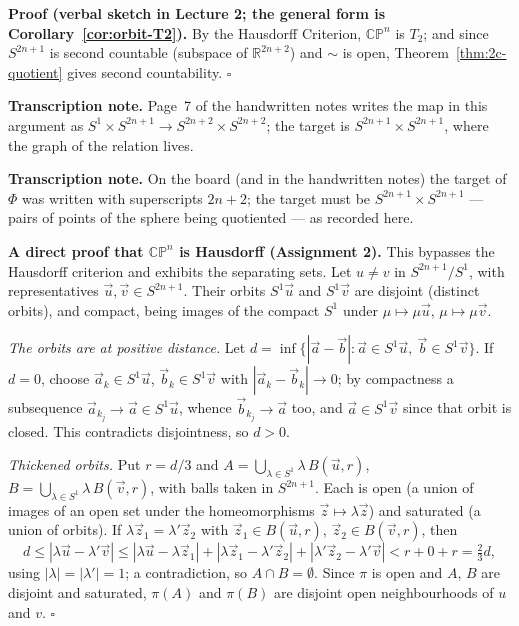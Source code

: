 \documentclass[11pt]{report}
\renewenvironment{proof}[1][Proof]{\noindent\textbf{#1.} }{\hfill$\square$\par\vspace{5pt}}
\begin{document}
\begin{proof}[Proof (verbal sketch in Lecture 2; the general form is Corollary~\ref{cor:orbit-T2})]
By the Hausdorff Criterion, $\mathbb{CP}^n$ is $T_2$; and since $S^{2n+1}$ is second countable (subspace of $\mathbb{R}^{2n+2}$) and $\sim$ is open, Theorem~\ref{thm:2c-quotient} gives second countability.
\end{proof}

\textbf{Transcription note.} Page~7 of the handwritten notes writes the map in this argument as $S^1 \times S^{2n+1} \to S^{2n+2} \times S^{2n+2}$; the target is $S^{2n+1} \times S^{2n+1}$, where the graph of the relation lives.

\textbf{Transcription note.} On the board (and in the handwritten notes) the target of $\Phi$ was written with superscripts $2n+2$; the target must be $S^{2n+1} \times S^{2n+1}$ --- pairs of points of the sphere being quotiented --- as recorded here.

\begin{proof}[A direct proof that $\mathbb{CP}^n$ is Hausdorff (Assignment 2)]
This bypasses the Hausdorff criterion and exhibits the separating sets. Let $u \neq v$ in $S^{2n+1}/S^1$, with representatives $\vec u, \vec v \in S^{2n+1}$. Their orbits $S^1 \vec u$ and $S^1 \vec v$ are disjoint (distinct orbits), and compact, being images of the compact $S^1$ under $\mu \mapsto \mu\vec u$, $\mu \mapsto \mu \vec v$.

\emph{The orbits are at positive distance.} Let $d = \inf\{|\vec a - \vec b| : \vec a \in S^1\vec u,\ \vec b \in S^1 \vec v\}$. If $d = 0$, choose $\vec a_k \in S^1\vec u$, $\vec b_k \in S^1\vec v$ with $|\vec a_k - \vec b_k| \to 0$; by compactness a subsequence $\vec a_{k_j} \to \vec a \in S^1\vec u$, whence $\vec b_{k_j} \to \vec a$ too, and $\vec a \in S^1 \vec v$ since that orbit is closed. This contradicts disjointness, so $d > 0$.

\emph{Thickened orbits.} Put $r = d/3$ and $A = \bigcup_{\lambda \in S^1} \lambda\, B(\vec u, r)$, $B = \bigcup_{\lambda \in S^1} \lambda\, B(\vec v, r)$, with balls taken in $S^{2n+1}$. Each is open (a union of images of an open set under the homeomorphisms $\vec z \mapsto \lambda\vec z$) and saturated (a union of orbits). If $\lambda\vec z_1 = \lambda'\vec z_2$ with $\vec z_1 \in B(\vec u, r)$, $\vec z_2 \in B(\vec v, r)$, then
\[
d \le |\lambda\vec u - \lambda'\vec v| \le |\lambda\vec u - \lambda \vec z_1| + |\lambda\vec z_1 - \lambda'\vec z_2| + |\lambda'\vec z_2 - \lambda'\vec v| < r + 0 + r = \tfrac23 d,
\]
using $|\lambda| = |\lambda'| = 1$; a contradiction, so $A \cap B = \emptyset$. Since $\pi$ is open and $A$, $B$ are disjoint and saturated, $\pi(A)$ and $\pi(B)$ are disjoint open neighbourhoods of $u$ and $v$.
\end{proof}
\end{document}
